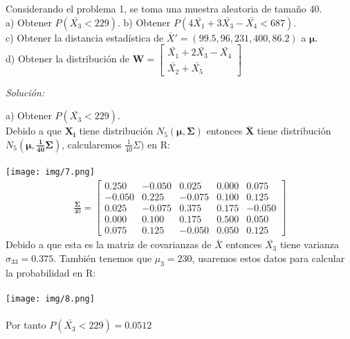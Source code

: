 \documentclass[12pt]{article}
\newenvironment{problem}[2][Problema]{\begin{trivlist}
\item[\hskip \labelsep {\bfseries #1}\hskip \labelsep {\bfseries #2.}]}{\end{trivlist}}
\newenvironment{sol}
    {\emph{Solución:}
    }
    {
    }
\begin{document}
\pagebreak

\begin{problem}{2}
Considerando el problema 1, se toma una muestra aleatoria de tamaño 40.\\
a) Obtener $P(\bar{X_3}<229)$. b) Obtener $P(4\bar{X_1}+3\bar{X_3}-\bar{X_4}<687)$.\\
c) Obtener la distancia estadística de $\bar{X}'=(99.5,96,231,400,86.2)$ a $\mathbf{\mu}$. \\
d) Obtener la distribución de $\mathbf{W}= \begin{bmatrix}
\bar{X_1} + 2\bar{X_3}-\bar{X_4} \\
\bar{X_2}+\bar{X_5}
\end{bmatrix}$
\end{problem}

\begin{sol}
a) Obtener $P(\bar{X_3}<229)$.\\
Debido a que $\mathbf{X_i}$ tiene distribución $N_5(\mathbf{\mu,\Sigma})$ entonces  $\mathbf{\bar{X}}$ tiene distribución $N_5(\mathbf{\mu,\frac{1}{40}\Sigma})$, calcularemos $\frac{1}{40}\Sigma)$ en R:\\\\
\texttt{[image: img/7.png]}
\begin{align*}
\frac{\mathbf{\Sigma}}{40} = \begin{bmatrix}
  0.250 & -0.050 &  0.025 & 0.000 &  0.075 \\
 -0.050 &  0.225 & -0.075 & 0.100 &  0.125 \\
  0.025 & -0.075 &  0.375 & 0.175 & -0.050 \\
  0.000 &  0.100 &  0.175 & 0.500 &  0.050 \\
  0.075 &  0.125 & -0.050 & 0.050 &  0.125
\end{bmatrix}
\end{align*}
Debido a que esta es la matriz de covarianzas de $\bar{X}$ entonces $\bar{X_3}$ tiene varianza $\sigma_{33}=0.375$. También tenemos que $\mu_3=230$, usaremos estos datos para calcular la probabilidad en R: \\\\
\texttt{[image: img/8.png]}\\\\
Por tanto $P(\bar{X_3}<229)=0.0512$ \pagebreak


\end{sol}
\end{document}
